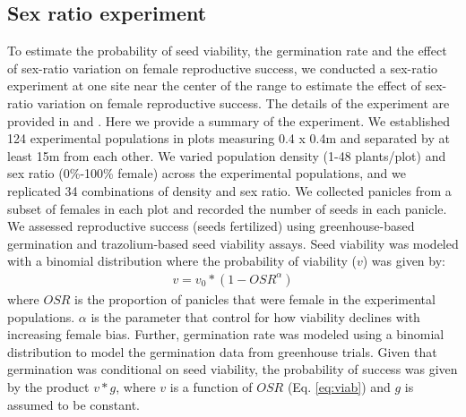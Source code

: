 \documentclass[12pt]{article}\usepackage[]{graphicx}\usepackage[dvipsnames]{xcolor}
\begin{document}
\subsection{Sex ratio experiment} \label {sssec:experiment}
To estimate the probability of seed viability,  the germination rate and the effect of sex-ratio variation on female reproductive success, we conducted a sex-ratio experiment at one site near the center of the range to estimate the effect of sex-ratio variation on female reproductive success.
The details of the experiment are provided in \cite{compagnoni2017can} and \cite{miller2022two}.
Here we provide a summary of the experiment.
We established 124 experimental populations in plots measuring 0.4 x 0.4m and separated by at least 15m from each other.
We varied population density (1-48 plants/plot) and sex ratio (0\%-100\% female) across the experimental populations, and we replicated 34 combinations of density and sex ratio.
We collected panicles from a subset of females in each plot and recorded the number of seeds in each panicle.
We assessed reproductive success (seeds fertilized) using greenhouse-based germination and trazolium-based seed viability assays.
Seed viability was modeled with a binomial distribution where the probability of viability ($v$) was given by:
\begin{align}\label{eq:viab}
	v = v_{0} * (1 - OSR^{\alpha})
\end{align}
\noindent where $OSR$ is the proportion of panicles that were female in the experimental populations.
$\alpha$ is the parameter that control for how viability declines with increasing female bias.
Further, germination rate was modeled using a binomial distribution to model the germination data from greenhouse trials.
Given that germination was conditional on seed viability, the probability of success was given by the product $v*g$, where $v$ is a function of $OSR$ (Eq. \ref{eq:viab}) and $g$ is assumed to be constant.
\end{document}

